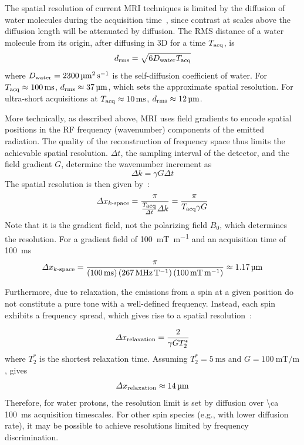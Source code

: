 The spatial resolution of current MRI techniques is limited by the diffusion of water molecules during the acquisition time~\cite{glover02}, since contrast at scales above the diffusion length will be attenuated by diffusion.
The RMS distance of a water molecule from its origin, after diffusing in 3D for a time $T_{\text{\scriptsize acq}}$, is
\[d_{\text{\scriptsize rms}} = \sqrt{6D_{\text{\scriptsize water}}T_{\text{\scriptsize acq}}}\]
where $D_{\text{\scriptsize water}}=\SI{2300}{\micro\meter\squared\per\second}$ is the self-diffusion coefficient of water.
For $T_{\text{\scriptsize acq}}\approx\SI{100}{\milli\second}$, $d_{\text{\scriptsize rms}}\approx\SI{37}{\micro\meter}$, which sets the approximate spatial resolution.
For ultra-short acquisitions at $T_{\text{\scriptsize acq}}\approx\SI{10}{\milli\second}$, $d_{\text{\scriptsize rms}}\approx\SI{12}{\micro\meter}$.

More technically, as described above, MRI uses field gradients to encode spatial positions in the RF frequency (wavenumber) components of the emitted radiation.
The quality of the reconstruction of frequency space thus limits the achievable spatial resolution.
$\Delta t$, the sampling interval of the detector, and the field gradient $G$, determine the wavenumber increment as
\[\Delta k = \gamma G \Delta t\]
The spatial resolution is then given by~\cite{glover02}:
\[\Delta x_{\text{\scriptsize $k$-space}} = \frac{\pi}{\frac{T_{\text{\scriptsize acq}}}{\Delta t} \Delta k} = \frac{\pi}{T_{\text{\scriptsize acq}} \gamma G}\]
Note that it is the gradient field, not the polarizing field $B_0$, which determines the resolution. For a gradient field of \SI{100}{\milli\tesla\per\meter} and an acquisition time of \SI{100}{\milli\second}
\[\Delta x\sub{$k$-space} = \frac{\pi}{\left(\SI{100}{\milli\second}\right)\left(\SI{267}{\MHz\per\tesla}\right)\left(\SI{100}{\milli\tesla\per\meter}\right)}\approx \SI{1.17}{\micro\meter}\]

Furthermore, due to relaxation, the emissions from a spin at a given position do not constitute a pure tone with a well-defined frequency. Instead, each spin exhibits a frequency spread, which gives rise to a spatial resolution~\cite{glover02}:

\[\Delta x_{\text{\scriptsize relaxation}} = \frac{2}{\gamma G T_2^*}\]
where $T_2^*$ is the shortest relaxation time. Assuming $T_2^*=\SI{5}{\milli\second}$ and $G=\SI{100}{\milli\tesla\per\meter}$, gives
\[\Delta x_{\text{\scriptsize relaxation}}\approx \SI{14}{\micro\meter}\]
Therefore, for water protons, the resolution limit is set by diffusion over \SI{\ca 100}{\milli\second} acquisition timescales. For other spin species (e.g., with lower diffusion rate), it may be possible to achieve resolutions limited by frequency discrimination.

